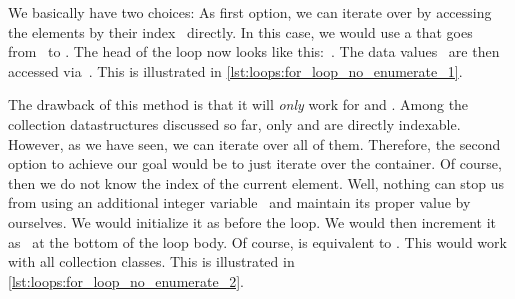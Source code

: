 We basically have two choices:
As first option, we can iterate over  by accessing the elements by their index~ directly.
In this case, we would use a  that goes from~ to .
The head of the loop now looks like this:~.
The data values~ are then accessed via~.
This is illustrated in \cref{lst:loops:for_loop_no_enumerate_1}.

The drawback of this method is that it will \emph{only} work for  and .
Among the collection datastructures discussed so far, only  and  are directly indexable.
However, as we have seen, we can iterate over all of them.
Therefore, the second option to achieve our goal would be to just  iterate over the container.
Of course, then we do not know the index of the current element.
Well, nothing can stop us from using an additional integer variable~ and maintain its proper value by ourselves.
We would initialize it as  before the loop.
We would then increment it as~ at the bottom of the loop body.
Of course,  is equivalent to \pythonIdx{+=}\pythonIdx{+}.
This would work with all collection classes.
This is illustrated in \cref{lst:loops:for_loop_no_enumerate_2}.

